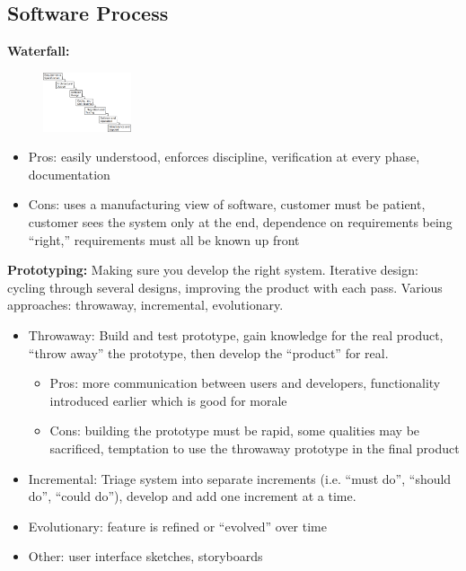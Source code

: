 \documentclass[8pt, letterpaper, titlepage]{article}
\begin{document}
\begin{multicols*}{2}
\subsection*{Software Process}

\textbf{Waterfall:}
\begin{figure}[H]
    \centering
    \includegraphics[width=0.23\textwidth]{Waterfall.png}
\end{figure}
\begin{itemize}
    \item Pros: easily understood, enforces discipline, verification at every phase, documentation
    \item Cons: uses a manufacturing view of software, customer must be patient, customer sees the system only at the end, dependence on requirements being ``right,'' requirements must all be known up front
\end{itemize}

\textbf{Prototyping:} Making sure you develop the right system. Iterative design: cycling through several designs, improving the product with each pass. Various approaches: throwaway, incremental, evolutionary.
\begin{itemize}
    \item Throwaway: Build and test prototype, gain knowledge for the real product, ``throw away'' the prototype, then develop the ``product'' for real.
    \begin{itemize}
        \item Pros: more communication between users and developers, functionality introduced earlier which is good for morale
        \item Cons: building the prototype must be rapid, some qualities may be sacrificed, temptation to use the throwaway prototype in the final product
    \end{itemize}
    \item Incremental: Triage system into separate increments (i.e. ``must do'', ``should do'', ``could do''), develop and add one increment at a time.
    \item Evolutionary: feature is refined or ``evolved'' over time
    \item Other: user interface sketches, storyboards
\end{itemize}


\end{multicols*}
\end{document}
